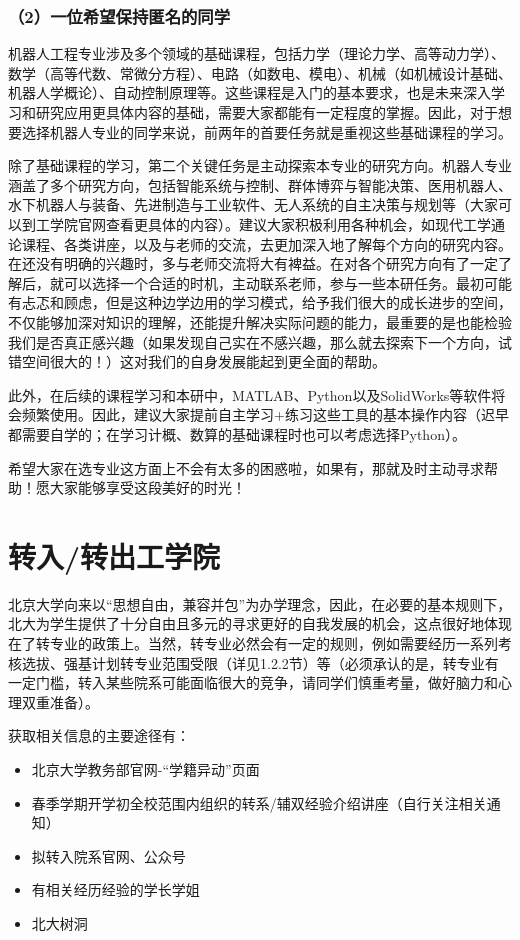 \documentclass[11pt,oneside]{book}
\begin{document}
\subsubsection{（2）一位希望保持匿名的同学}
机器人工程专业涉及多个领域的基础课程，包括力学（理论力学、高等动力学）、数学（高等代数、常微分方程）、电路（如数电、模电）、机械（如机械设计基础、机器人学概论）、自动控制原理等。这些课程是入门的基本要求，也是未来深入学习和研究应用更具体内容的基础，需要大家都能有一定程度的掌握。因此，对于想要选择机器人专业的同学来说，前两年的首要任务就是重视这些基础课程的学习。

除了基础课程的学习，第二个关键任务是主动探索本专业的研究方向。机器人专业涵盖了多个研究方向，包括智能系统与控制、群体博弈与智能决策、医用机器人、水下机器人与装备、先进制造与工业软件、无人系统的自主决策与规划等（大家可以到工学院官网查看更具体的内容）。建议大家积极利用各种机会，如现代工学通论课程、各类讲座，以及与老师的交流，去更加深入地了解每个方向的研究内容。在还没有明确的兴趣时，多与老师交流将大有裨益。在对各个研究方向有了一定了解后，就可以选择一个合适的时机，主动联系老师，参与一些本研任务。最初可能有忐忑和顾虑，但是这种边学边用的学习模式，给予我们很大的成长进步的空间，不仅能够加深对知识的理解，还能提升解决实际问题的能力，最重要的是也能检验我们是否真正感兴趣（如果发现自己实在不感兴趣，那么就去探索下一个方向，试错空间很大的！）这对我们的自身发展能起到更全面的帮助。

此外，在后续的课程学习和本研中，MATLAB、Python以及SolidWorks等软件将会频繁使用。因此，建议大家提前自主学习+练习这些工具的基本操作内容（迟早都需要自学的；在学习计概、数算的基础课程时也可以考虑选择Python）。

希望大家在选专业这方面上不会有太多的困惑啦，如果有，那就及时主动寻求帮助！愿大家能够享受这段美好的时光！

\newpage
        
\section{转入/转出工学院}
北京大学向来以“思想自由，兼容并包”为办学理念，因此，在必要的基本规则下，北大为学生提供了十分自由且多元的寻求更好的自我发展的机会，这点很好地体现在了转专业的政策上。当然，转专业必然会有一定的规则，例如需要经历一系列考核选拔、强基计划转专业范围受限（详见1.2.2节）等（必须承认的是，转专业有一定门槛，转入某些院系可能面临很大的竞争，请同学们慎重考量，做好脑力和心理双重准备）。

获取相关信息的主要途径有：
\begin{itemize}
    \item 北京大学教务部官网-“学籍异动”页面

    \item 春季学期开学初全校范围内组织的转系/辅双经验介绍讲座（自行关注相关通知）
    \item 拟转入院系官网、公众号
    \item 有相关经历经验的学长学姐
    \item 北大树洞
\end{itemize}
\end{document}
